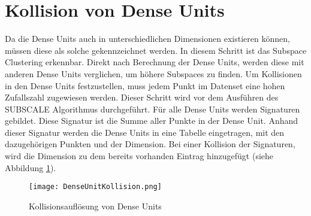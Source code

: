 \section{Kollision von Dense Units}

Da die Dense Units auch in unterschiedlichen Dimensionen existieren können, müssen diese als solche gekennzeichnet werden. In diesem Schritt ist das Subspace Clustering erkennbar. Direkt nach Berechnung der Dense Units, werden diese mit anderen Dense Units verglichen, um höhere Subspaces zu finden. Um Kollisionen in den Dense Units festzustellen, muss jedem Punkt im Datenset eine hohen Zufallszahl zugewiesen werden. Dieser Schritt wird vor dem Ausführen des SUBSCALE Algorithmus durchgeführt. Für alle Dense Units werden Signaturen gebildet. Diese Signatur ist die Summe aller Punkte in der Dense Unit. Anhand dieser Signatur werden die Dense Units in eine Tabelle eingetragen, mit den dazugehörigen Punkten und der Dimension. Bei einer Kollision der Signaturen, wird die Dimension zu dem bereits vorhanden Eintrag hinzugefügt (siehe Abbildung \ref{dense-collision}). \cite{Ramin}

\begin{figure}[h]
	\centering
	\texttt{[image: DenseUnitKollision.png]}
	\caption{Kollisionsauflösung von Dense Units}
	\label{dense-collision}
\end{figure}


